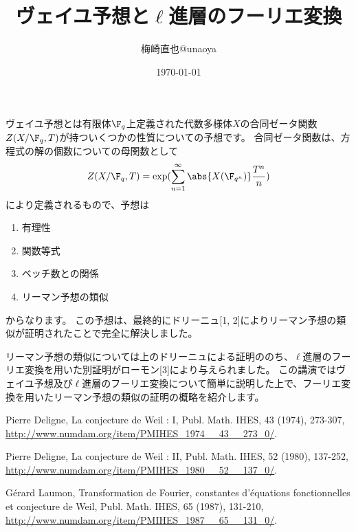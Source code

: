 \documentclass[uplatex]{jsarticle}
\title{ヴェイユ予想と$\ell$進層のフーリエ変換}
\author{梅崎直也@unaoya}
\date{\today}
\begin{document}
\maketitle

ヴェイユ予想とは有限体$\F_q$上定義された代数多様体$X$の合同ゼータ関数$Z(X/\F_q,T)$が持ついくつかの性質についての予想です。
合同ゼータ関数は、方程式の解の個数についての母関数として
\begin{align*}
  Z(X/\F_q,T)=\exp(\sum_{n=1}^\infty\abs{X(\F_{q^n})}\frac{T^n}{n})
\end{align*}
により定義されるもので、予想は
\begin{enumerate}
\item 有理性
\item 関数等式
\item ベッチ数との関係
\item リーマン予想の類似
\end{enumerate}
からなります。
この予想は、最終的にドリーニュ[1, 2]によりリーマン予想の類似が証明されたことで完全に解決しました。

リーマン予想の類似については上のドリーニュによる証明ののち、$\ell$進層のフーリエ変換を用いた別証明がローモン[3]により与えられました。
この講演ではヴェイユ予想及び$\ell$進層のフーリエ変換について簡単に説明した上で、フーリエ変換を用いたリーマン予想の類似の証明の概略を紹介します。

\begin{thebibliography}{99}
\item Pierre Deligne, La conjecture de Weil : I, Publ. Math. IHES, 43 (1974), 273-307, \url{http://www.numdam.org/item/PMIHES_1974__43__273_0/}.
\item Pierre Deligne, La conjecture de Weil : II, Publ. Math. IHES, 52 (1980), 137-252, \url{http://www.numdam.org/item/PMIHES_1980__52__137_0/}.
\item G\'erard Laumon, Transformation de Fourier, constantes d'\'equations fonctionnelles et conjecture de Weil, Publ. Math. IHES, 65 (1987), 131-210, \url{http://www.numdam.org/item/PMIHES_1987__65__131_0/}.
\end{thebibliography}
\end{document}
